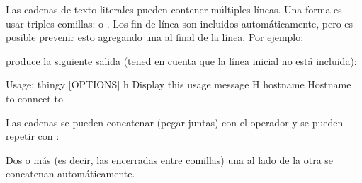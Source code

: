 \documentclass[a4,10pt,spanish]{sphinxmanual}
\begin{document}
\sphinxAtStartPar
Las cadenas de texto literales pueden contener múltiples líneas. Una forma es usar triples comillas:  o . Los fin de línea son incluidos automáticamente, pero es posible prevenir esto agregando una \sphinxcode{\sphinxupquote{\textbackslash{}}} al final de la línea. Por ejemplo:

\begin{sphinxVerbatim}[commandchars=\\\{\}]
\end{sphinxVerbatim}

\sphinxAtStartPar
produce la siguiente salida (tened en cuenta que la línea inicial no está incluida):

\begin{sphinxVerbatim}[commandchars=\\\{\}]
Usage: thingy [OPTIONS]
     \PYGZhy{}h                        Display this usage message
     \PYGZhy{}H hostname               Hostname to connect to
\end{sphinxVerbatim}

\sphinxAtStartPar
Las cadenas se pueden concatenar (pegar juntas) con el operador \sphinxcode{\sphinxupquote{+}} y se pueden repetir con \sphinxcode{\sphinxupquote{*}}:

\begin{sphinxVerbatim}[commandchars=\\\{\}]
    
\end{sphinxVerbatim}

\sphinxAtStartPar
Dos o más  (es decir, las encerradas entre comillas) una al lado de la otra se concatenan automáticamente.

\begin{sphinxVerbatim}[commandchars=\\\{\}]
 
\end{sphinxVerbatim}
\end{document}
